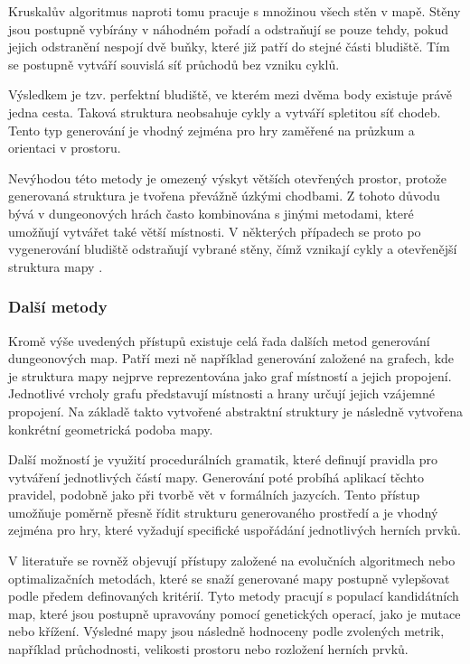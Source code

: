 \documentclass[
  program=itk,
  biblatex,
  figures=false,
  glossaries,
  index
]{kidiplom}
\begin{document}
Kruskalův algoritmus naproti tomu pracuje s množinou všech stěn v mapě. Stěny jsou postupně vybírány v náhodném pořadí a odstraňují se pouze tehdy, pokud jejich odstranění nespojí dvě buňky, které již patří do stejné části bludiště. Tím se postupně vytváří souvislá síť průchodů bez vzniku cyklů.

Výsledkem je tzv. perfektní bludiště, ve kterém mezi dvěma body existuje právě jedna cesta. Taková struktura neobsahuje cykly a vytváří spletitou síť chodeb. Tento typ generování je vhodný zejména pro hry zaměřené na průzkum a orientaci v prostoru.

Nevýhodou této metody je omezený výskyt větších otevřených prostor, protože generovaná struktura je tvořena převážně úzkými chodbami. Z tohoto důvodu bývá v dungeonových hrách často kombinována s jinými metodami, které umožňují vytvářet také větší místnosti. V některých případech se proto po vygenerování bludiště odstraňují vybrané stěny, čímž vznikají cykly a otevřenější struktura mapy \cite{Linden2014,Shaker2016}.


\subsubsection{Další metody}

Kromě výše uvedených přístupů existuje celá řada dalších metod generování dungeonových map. Patří mezi ně například generování založené na grafech, kde je struktura mapy nejprve reprezentována jako graf místností a jejich propojení. Jednotlivé vrcholy grafu představují místnosti a hrany určují jejich vzájemné propojení. Na základě takto vytvořené abstraktní struktury je následně vytvořena konkrétní geometrická podoba mapy.

Další možností je využití procedurálních gramatik, které definují pravidla pro vytváření jednotlivých částí mapy. Generování poté probíhá aplikací těchto pravidel, podobně jako při tvorbě vět v formálních jazycích. Tento přístup umožňuje poměrně přesně řídit strukturu generovaného prostředí a je vhodný zejména pro hry, které vyžadují specifické uspořádání jednotlivých herních prvků.

V literatuře se rovněž objevují přístupy založené na evolučních algoritmech nebo optimalizačních metodách, které se snaží generované mapy postupně vylepšovat podle předem definovaných kritérií. Tyto metody pracují s populací kandidátních map, které jsou postupně upravovány pomocí genetických operací, jako je mutace nebo křížení. Výsledné mapy jsou následně hodnoceny podle zvolených metrik, například průchodnosti, velikosti prostoru nebo rozložení herních prvků.
\end{document}
